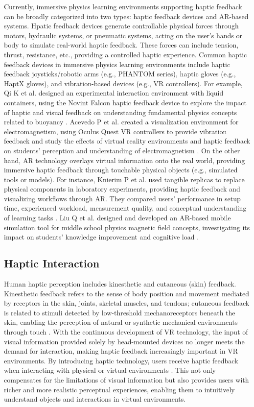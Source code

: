 \documentclass[sigconf,review,anonymous]{acmart}
\begin{document}
Currently, immersive physics learning environments supporting haptic feedback can be broadly categorized into two types: haptic feedback devices and AR-based systems. Hpatic feedback devices generate controllable physical forces through motors, hydraulic systems, or pneumatic systems, acting on the user's hands or body to simulate real-world haptic feedback. These forces can include tension, thrust, resistance, etc., providing a controlled haptic experience. Common haptic feedback devices in immersive physics learning environments include haptic feedback joysticks/robotic arms (e.g., PHANTOM series), haptic gloves (e.g., HaptX gloves), and vibration-based devices (e.g., VR controllers). For example, Qi K et al. designed an experimental interaction environment with liquid containers, using the Novint Falcon haptic feedback device to explore the impact of haptic and visual feedback on understanding fundamental physics concepts related to buoyancy \cite{qi2020impact}. Acevedo P et al. created a visualization environment for electromagnetism, using Oculus Quest VR controllers to provide vibration feedback and study the effects of virtual reality environments and haptic feedback on students' perception and understanding of electromagnetism \cite{acevedo2022effects}. On the other hand, AR technology overlays virtual information onto the real world, providing immersive haptic feedback through touchable physical objects (e.g., simulated tools or models). For instance, Knierim P et al. used tangible replicas to replace physical components in laboratory experiments, providing haptic feedback and visualizing workflows through AR. They compared users' performance in setup time, experienced workload, measurement quality, and conceptual understanding of learning tasks \cite{knierim2020tangibility}. Liu Q et al. designed and developed an AR-based mobile simulation tool for middle school physics magnetic field concepts, investigating its impact on students' knowledge improvement and cognitive load \cite{liu2021effects}.

\subsection{Haptic Interaction}
Human haptic perception includes kinesthetic and cutaneous (skin) feedback. Kinesthetic feedback refers to the sense of body position and movement mediated by receptors in the skin, joints, skeletal muscles, and tendons; cutaneous feedback is related to stimuli detected by low-threshold mechanoreceptors beneath the skin, enabling the perception of natural or synthetic mechanical environments through touch \cite{hayward2004haptic}. With the continuous development of VR technology, the input of visual information provided solely by head-mounted devices no longer meets the demand for interaction, making haptic feedback increasingly important in VR environments. By introducing haptic technology, users receive haptic feedback when interacting with physical or virtual environments \cite{sreelakshmi2017haptic}. This not only compensates for the limitations of visual information but also provides users with richer and more realistic perceptual experiences, enabling them to intuitively understand objects and interactions in virtual environments.
\end{document}
